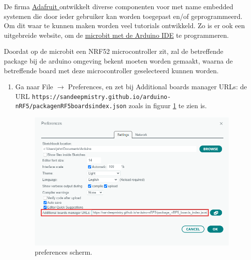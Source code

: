De firma \href{https://www.adafruit.com/about}{Adafruit } ontwikkelt diverse componenten voor met name embedded systemen
die door ieder gebruiker kan worden toegepast en/of geprogrammeerd. Om dit waar te kunnen maken worden veel tutorials ontwikkeld. Zo is er ook een uitgebreide website, om de \href{https://learn.adafruit.com/use-micro-bit-with-arduino}{microbit met de Arduino IDE} te programmeren.

Doordat op de microbit een NRF52 microcontroller zit, zal de betreffende package bij de arduino omgeving bekent moeten worden gemaakt, waarna de betreffende board met deze microcontroller geselecteerd kunnen worden.
\begin{enumerate}
	\item  Ga naar File $\rightarrow$ Preferences, en zet bij Additional boards manager URLs: de URL  %
    {\scriptsize \texttt{https://sandeepmistry.github.io/arduino-nRF5/package\textunderscore nRF5\textunderscore boards\textunderscore index.json}}  zoals in figuur \ref{fig:arduinoPref2} te zien is.\\ 

	\begin{figure}[H]
		\captionsetup{justification=centering}
		\includegraphics[width=0.60 \linewidth]{figuren/arduinoPref2}
		\centering
		\caption{preferences scherm.}
		\label{fig:arduinoPref2}
	\end{figure}
	

\end{enumerate}
